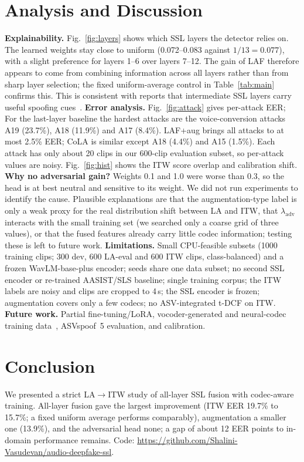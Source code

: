 \documentclass[conference]{IEEEtran}
\begin{document}
\section{Analysis and Discussion}
\textbf{Explainability.} Fig.~\ref{fig:layers} shows which SSL layers the detector relies on. The learned weights stay close to uniform (0.072--0.083 against $1/13=0.077$), with a slight preference for layers 1--6 over layers 7--12. The gain of LAF therefore appears to come from combining information across all layers rather than from sharp layer selection; the fixed uniform-average control in Table~\ref{tab:main} confirms this. This is consistent with reports that intermediate SSL layers carry useful spoofing cues~\cite{zhang2024sls,pascu2024towards}. \textbf{Error analysis.} Fig.~\ref{fig:attack} gives per-attack EER; For the last-layer baseline the hardest attacks are the voice-conversion attacks A19 (23.7\%), A18 (11.9\%) and A17 (8.4\%). LAF+aug brings all attacks to at most 2.5\% EER; CoLA is similar except A18 (4.4\%) and A15 (1.5\%). Each attack has only about 20 clips in our 600-clip evaluation subset, so per-attack values are noisy. Fig.~\ref{fig:hist} shows the ITW score overlap and calibration shift. \textbf{Why no adversarial gain?} Weights 0.1 and 1.0 were worse than 0.3, so the head is at best neutral and sensitive to its weight. We did not run experiments to identify the cause. Plausible explanations are that the augmentation-type label is only a weak proxy for the real distribution shift between LA and ITW, that $\lambda_{\mathrm{adv}}$ interacts with the small training set (we searched only a coarse grid of three values), or that the fused features already carry little codec information; testing these is left to future work. \textbf{Limitations.} Small CPU-feasible subsets (1000 training clips; 300 dev, 600 LA-eval and 600 ITW clips, class-balanced) and a frozen WavLM-base-plus encoder; seeds share one data subset; no second SSL encoder or re-trained AASIST/SLS baseline; single training corpus; the ITW labels are noisy and clips are cropped to 4\,s; the SSL encoder is frozen; augmentation covers only a few codecs; no ASV-integrated t-DCF on ITW. \textbf{Future work.} Partial fine-tuning/LoRA, vocoder-generated and neural-codec training data~\cite{wang2023vocoded,xu2024codecfake}, ASVspoof~5 evaluation, and calibration.

\section{Conclusion}
We presented a strict LA$\rightarrow$ITW study of all-layer SSL fusion with codec-aware training. All-layer fusion gave the largest improvement (ITW EER 19.7\% to 15.7\%; a fixed uniform average performs comparably), augmentation a smaller one (13.9\%), and the adversarial head none; a gap of about 12 EER points to in-domain performance remains. Code: \url{https://github.com/Shalini-Vasudevan/audio-deepfake-ssl}.


\end{document}
